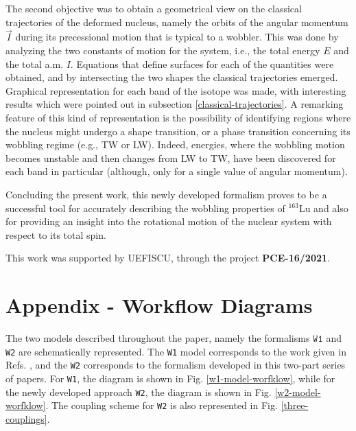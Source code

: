 \documentclass[myclassdoc,debug]{rjparticle}
\begin{document}
The second objective was to obtain a geometrical view on the classical trajectories of the deformed nucleus, namely the orbits of the angular momentum $\vec{I}$ during its precessional motion that is typical to a wobbler. This was done by analyzing the two constants of motion for the system, i.e., the total energy $E$ and the total a.m. $I$. Equations that define surfaces for each of the quantities were obtained, and by intersecting the two shapes the classical trajectories emerged. Graphical representation for each band of the isotope was made, with interesting results which were pointed out in subsection \ref{classical-trajectories}. A remarking feature of this kind of representation is the possibility of identifying regions where the nucleus might undergo a shape transition, or a phase transition concerning its wobbling regime (e.g., TW or LW). Indeed, energies, where the wobbling motion becomes unstable and then changes from LW to TW, have been discovered for each band in particular (although, only for a single value of angular momentum).

Concluding the present work, this newly developed formalism proves to be a successful tool for accurately describing the wobbling properties of $^{163}$Lu and also for providing an insight into the rotational motion of the nuclear system with respect to its total spin.

\begin{acknowledgement}
This work was supported by UEFISCU, through the project \textbf{PCE-16/2021}.
\end{acknowledgement}

\appendix
\section{Appendix - Workflow Diagrams}
\label{appendix:a}
The two models described throughout the paper, namely the formalisms $\texttt{W1}$ and \texttt{W2} are schematically represented. The \texttt{W1} model corresponds to the work given in Refs. \cite{raduta2020approach,raduta2020towards}, and the \texttt{W2} corresponds to the formalism developed in this two-part series of papers. For \texttt{W1}, the diagram is shown in Fig. \ref{w1-model-worfklow}, while for the newly developed approach \texttt{W2}, the diagram is shown in Fig. \ref{w2-model-worfklow}. The coupling scheme for \texttt{W2} is also represented in Fig. \ref{three-couplings}.
\end{document}
